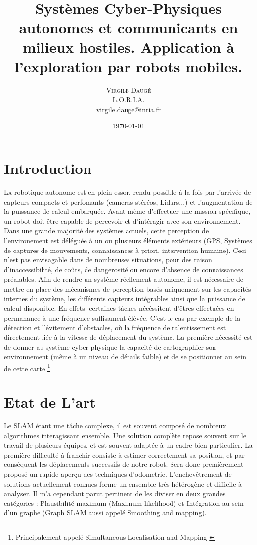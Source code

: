 \documentclass[twoside,twocolumn]{article}
\title{Systèmes Cyber-Physiques autonomes et communicants en milieux hostiles. Application à l’exploration par robots mobiles. } %
\author{%
\textsc{Virgile Daugé} \\[1ex] %
\normalsize L.O.R.I.A. \\ %
\normalsize \href{mailto:virgile.dauge@inria.fr}{virgile.dauge@inria.fr} %
}
\date{\today} %
\begin{document}
\maketitle


\section{Introduction}

\lettrine[nindent=0em,lines=3]{L}a robotique autonome est en plein essor, rendu possible à la fois
par l'arrivée de capteurs compacts et perfomants (cameras stéréos, Lidars...) et l'augmentation de la puissance de calcul embarquée.
Avant même d'effectuer une mission spécifique, un robot doit être capable de percevoir et d'intéragir avec son environnement.
Dans une grande majorité des systèmes actuels, cette perception de l'environement est déléguée à un ou plusieurs éléments extérieurs
(GPS, Systèmes de captures de mouvements, connaissances à priori, intervention humaine). Ceci n'est pas envisagable dans de nombreuses situations,
pour des raison d'inaccessibilité, de coûts, de dangerosité ou encore d'absence de connaissances préalables. Afin de rendre un système réellement autonome,
il est nécessaire de mettre en place des mécanismes de perception basés uniquement sur les capacités internes du système, les différents capteurs intégrables
ainsi que la puissance de calcul disponible. En effets, certaines tâches nécéssitent d'êtres effectuées en permanance à une fréquence suffisament élévée.
C'est le cas par exemple de la détection et l'évitement d'obstacles,
où la fréquence de ralentissement est directement liée à la vitesse de déplacement du système.
La première nécessité est de donner au système cyber-physique la capacité de cartographier son environnement
(même à un niveau de détails faible) et de se positionner au sein de cette carte
\footnote{Principalement appelé Simultaneous Localisation and Mapping \cite{durrant-whyte_simultaneous_2006}\cite{bailey_simultaneous_2006}}

\section{Etat de L'art}
Le SLAM étant une tâche complexe, il est souvent composé de nombreux algorithmes interagissant ensemble.
Une solution complète repose souvent sur le travail de plusieurs équipes, et est souvent adaptée à un cadre bien particulier.
La première difficulté à franchir consiste à estimer correctement sa position, et par conséquent les déplacements successifs de notre robot.
Sera donc premièrement proposé un rapide aperçu des techniques d'odometrie.
L'enchevêtrement de solutions actuellement connues forme un ensemble très hétérogène et difficile à analyser.
Il m'a cependant parut pertinent de les diviser en deux grandes catégories : Plausibilité maximum (Maximum likelihood)
et Intégration au sein d'un graphe (Graph SLAM aussi appelé Smoothing and mapping).
\end{document}
